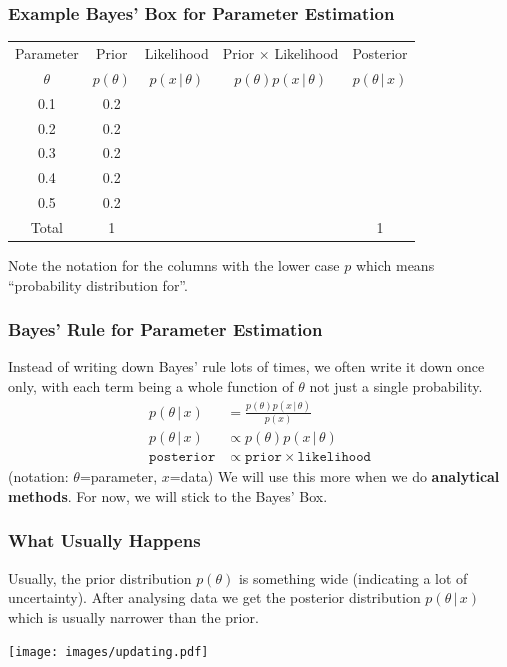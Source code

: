 \documentclass{beamer}
\newcommand{\given}{\,|\,}
\begin{document}
\begin{frame}
\frametitle{Example Bayes' Box for Parameter Estimation}
\begin{tabular}{|c|c|c|c|c|}
\hline
Parameter & Prior & Likelihood & Prior $\times$ Likelihood & Posterior \\
$\theta$  & $p(\theta)$ & $p(x \given \theta)$ & $p(\theta)p(x\given\theta)$ & $p(\theta\given x)$ \\
\hline
0.1 & 0.2  &  & & \\
0.2 & 0.2  &  & & \\
0.3 & 0.2 &  & & \\
0.4 & 0.2  &  & & \\
0.5 & 0.2 & & & \\
\hline
Total & 1 & & & 1 \\
\hline
\end{tabular}
\pause
\vspace{1em}

Note the notation for the columns with the lower case $p$
which means ``probability distribution for''.


\end{frame}


\begin{frame}
\frametitle{Bayes' Rule for Parameter Estimation}
Instead of writing down Bayes' rule lots of times, we often write it down
once only, with each term being a whole function of $\theta$ not just
a single probability.\pause
\begin{align}
p(\theta \given x) &= \frac{p(\theta)p(x \given \theta)}{p(x)} \\
p(\theta \given x) &\propto p(\theta)p(x \given \theta) \\
\texttt{posterior} &\propto \texttt{prior} \times \texttt{likelihood}
\end{align}
\pause
(notation: $\theta$=parameter, $x$=data)
We will use this more when we do {\bf analytical methods}. For now, we will
stick to the Bayes' Box.


\end{frame}


\begin{frame}
\frametitle{What Usually Happens}
Usually, the prior distribution $p(\theta)$ is something wide (indicating
a lot of uncertainty). After analysing data we get the posterior distribution
$p(\theta \given x)$ which is usually narrower than the prior.

\begin{center}
\texttt{[image: images/updating.pdf]}
\end{center}

\end{frame}
\end{document}
